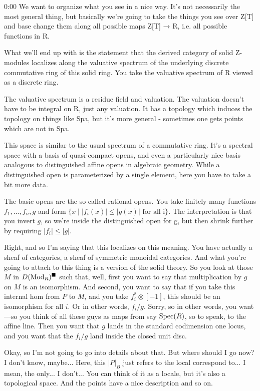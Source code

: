 \begin{unfinished}{0:00}
We want to organize what you see in a nice way. It's not necessarily the most general thing, but basically we're going to take the things you see over Z[T] and base change them along all possible maps Z[T] → R, i.e. all possible functions in R.

What we'll end up with is the statement that the derived category of solid Z-modules localizes along the valuative spectrum of the underlying discrete commutative ring of this solid ring. You take the valuative spectrum of R viewed as a discrete ring.

The valuative spectrum is a residue field and valuation. The valuation doesn't have to be integral on R, just any valuation. It has a topology which induces the topology on things like Spa, but it's more general - sometimes one gets points which are not in Spa.

This space is similar to the usual spectrum of a commutative ring. It's a spectral space with a basis of quasi-compact opens, and even a particularly nice basis analogous to distinguished affine opens in algebraic geometry. While a distinguished open is parameterized by a single element, here you have to take a bit more data.

The basic opens are the so-called rational opens. You take finitely many functions $f_1,...,f_n, g$ and form $\{x \mid |f_i(x)| \le |g(x)|\text { for all i}\}$. The interpretation is that you invert $g$, so we're inside the distinguished open for g, but then shrink further by requiring $|f_i| \le |g|$.

Right, and so I'm saying that this localizes on this meaning. You have actually a sheaf of categories, a sheaf of symmetric monoidal categories. And what you're going to attach to this thing is a version of the solid theory. So you look at those $M$ in $D(\operatorname{Mod}_R)^\blacksquare$ such that, well, first you want to say that multiplication by $g$ on $M$ is an isomorphism. And second, you want to say that if you take this internal hom from $P$ to $M$, and you take $f_i^* \otimes [-1]$, this should be an isomorphism for all $i$. Or in other words, $f_i/g$. Sorry, so in other words, you want---so you think of all these guys as maps from say $\operatorname{Spec}(R)$, so to speak, to the affine line. Then you want that $g$ lands in the standard codimension one locus, and you want that the $f_i/g$ land inside the closed unit disc.

Okay, so I'm not going to go into details about that. But where should I go now? I don't know, maybe... Here, this $|P|_B$ just refers to the local correspond to... I mean, the only... I don't... You can think of it as a locale, but it's also a topological space. And the points have a nice description and so on.


\end{unfinished}
